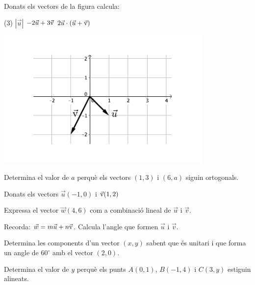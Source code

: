  
\begin{mylist}
	
 \exer[2] \begin{minipage}[t]{0.6\textwidth}
 	Donats els vectors de la figura calcula:
 \begin{tasks}(3)
 	\task $|\vec u|$
 	\task $-2\vec u + 3\vec{\mathrm{v}}$
 	\task $2\vec u \cdot (\vec u + \vec{\mathrm{v}})$	
 \end{tasks}
\end{minipage}
\begin{minipage}{0.4\textwidth}
	\begin{center}
	\includegraphics[width=0.8\textwidth]{img-10-bloc3/bloc3-vectors}
	\end{center}
\end{minipage}

\exer[2] Determina el valor de $a$ perquè els vectors $(1,3)$ i $(6,a)$ siguin ortogonals.

\exer[2] Donats els vectors $\vec u(-1,0)$ i $\vec{\mathrm{v}}(1,2)$
 \begin{tasks}
	\task Expressa el vector $\vec w(4,6)$ com a combinació lineal de $\vec u$ i $\vec v$.
	
	 Recorda: $\vec w= m \vec u + n \vec{\mathrm{v}}$.
	\task Calcula l'angle que formen  $\vec u$ i $\vec v$.
\end{tasks}

\exer[2] Determina les components d'un vector $(x,y)$ sabent que és unitari i que forma un angle de $60^\circ$ amb el vector $(2,0)$.

\exer[2] Determina el valor de $y$ perquè els punts $A(0,1)$, $B(-1,4)$ i $C(3,y)$ estiguin alineats.


\end{mylist}
